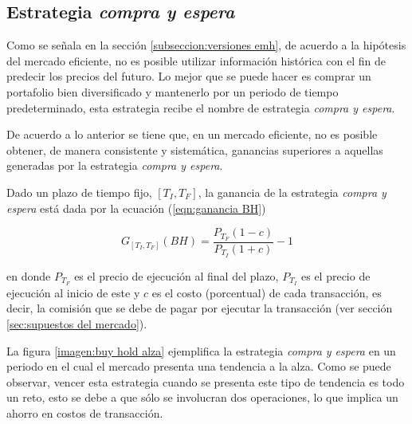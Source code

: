 \documentclass[12pt]{report}
\theoremstyle{break}
\theoremstyle{break}
\begin{document}
\subsection{Estrategia \textit{compra y espera}}
\label{seccion:buy and hold}
Como se señala en la sección \ref{subseccion:versiones emh}, de acuerdo a la hipótesis del mercado eficiente, no es posible utilizar información histórica con el fin de predecir los precios del futuro. Lo mejor que se puede hacer es comprar un portafolio bien diversificado y mantenerlo por un periodo de tiempo predeterminado, esta estrategia recibe el nombre de estrategia \textit{compra y espera}.

De acuerdo a lo anterior se tiene que, en un mercado eficiente, no es posible obtener, de manera consistente y sistemática, ganancias superiores a aquellas generadas por la estrategia \textit{compra y espera}.

Dado un plazo de tiempo fijo, $\left[T_{I}, T_{F}\right]$, la ganancia de la estrategia \textit{compra y espera} está dada por la ecuación (\ref{eqn:ganancia BH})

\begin{equation} \label{eqn:ganancia BH}
G_{\left[T_{I}, T_{F}\right]} (BH) = \dfrac{P_{T_F} (1 - c) } { P_{T_I} (1 + c) } - 1
\end{equation}

en donde $P_{T_F}$ es el precio de ejecución al final del plazo, $P_{T_I}$ es el precio de ejecución al inicio de este y $c$ es el costo (porcentual) de cada transacción, es decir, la comisión que se debe de pagar por ejecutar la transacción (ver sección \ref{sec:supuestos del mercado}). 

La figura \ref{imagen:buy hold alza} ejemplifica la estrategia \textit{compra y espera} en un periodo en el cual el mercado presenta una tendencia a la alza. Como se puede observar, vencer esta estrategia cuando se presenta este tipo de tendencia es todo un reto, esto se debe a que sólo se involucran dos operaciones, lo que implica un ahorro en costos de transacción.
\end{document}

